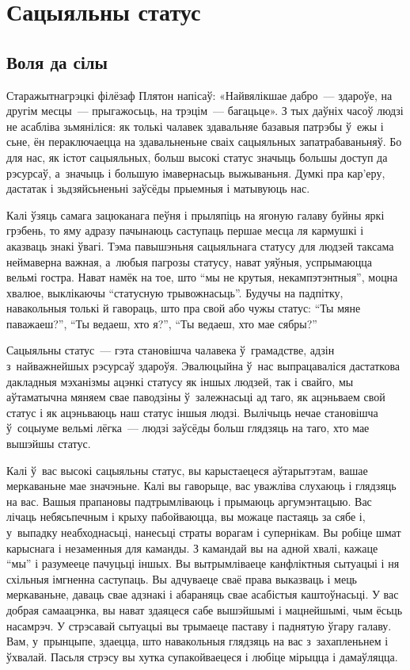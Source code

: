 \chapter{Сацыяльны статус}

\section{Воля да сілы}

Старажытнагрэцкі філёзаф Плятон напісаў: «Найвялікшае дабро~--- здароўе, на другім месцы~--- прыгажосьць, на трэцім~--- багацьце». З тых даўніх часоў людзі не асабліва зьмяніліся: як толькі чалавек здавальняе базавыя патрэбы ў~ежы і сьне, ён пераключаецца на здавальненьне сваіх сацыяльных запатрабаваньняў. Бо для нас, як істот сацыяльных, больш высокі статус значыць большы доступ да рэсурсаў, а~значыць і большую імавернасьць выжываньня. Думкі пра кар'еру, дастатак і зьдзяйсьненьні заўсёды прыемныя і матывуюць нас.

Калі ўзяць самага зацюканага пеўня і прыляпіць на ягоную галаву буйны яркі грэбень, то яму адразу пачынаюць саступаць першае месца ля кармушкі і аказваць знакі ўвагі. Тэма павышэньня сацыяльнага статусу для людзей таксама неймаверна важная, а~любыя пагрозы статусу, нават уяўныя, успрымаюцца вельмі гостра. Нават намёк на тое, што ``мы не крутыя, некампэтэнтныя'', моцна хвалюе, выклікаючы ``статусную трывожнасьць''. Будучы на падпітку, навакольныя толькі й гавораць, што пра свой або чужы статус: ``Ты мяне паважаеш?'', ``Ты ведаеш, хто я?'', ``Ты ведаеш, хто мае сябры?''

Сацыяльны статус~--- гэта становішча чалавека ў~грамадстве, адзін з~найважнейшых рэсурсаў здароўя. Эвалюцыйна ў~нас выпрацаваліся дастаткова дакладныя мэханізмы ацэнкі статусу як іншых людзей, так і свайго, мы аўтаматычна мяняем свае паводзіны ў~залежнасьці ад таго, як ацэньваем свой статус і як ацэньваюць наш статус іншыя людзі. Вылічыць нечае становішча ў~соцыуме вельмі лёгка~--- людзі заўсёды больш глядзяць на таго, хто мае вышэйшы статус.

Калі ў~вас высокі сацыяльны статус, вы карыстаецеся аўтарытэтам, вашае меркаваньне мае значэньне. Калі вы гаворыце, вас уважліва слухаюць і глядзяць на вас. Вашыя прапановы падтрымліваюць і прымаюць аргумэнтацыю. Вас лічаць небясьпечным і крыху пабойваюцца, вы можаце пастаяць за сябе і, у~выпадку неабходнасьці, нанесьці страты ворагам і супернікам. Вы робіце шмат карыснага і незаменныя для каманды. З камандай вы на адной хвалі, кажаце ``мы'' і разумееце пачуцьці іншых. Вы вытрымліваеце канфліктныя сытуацыі і ня схільныя імгненна саступаць. Вы адчуваеце сваё права выказваць і мець меркаваньне, даваць свае адзнакі і абараняць свае асабістыя каштоўнасьці. У вас добрая самаацэнка, вы нават здаяцеся сабе вышэйшымі і мацнейшымі, чым ёсьць насамрэч. У стрэсавай сытуацыі вы трымаеце паставу і паднятую ўгару галаву. Вам, у~прынцыпе, здаецца, што навакольныя глядзяць на вас з~захапленьнем і ўхвалай. Пасьля стрэсу вы хутка супакойваецеся і любіце мірыцца і дамаўляцца.

